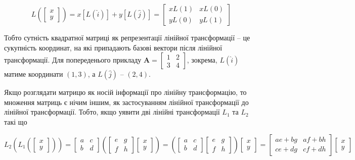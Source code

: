 \documentclass[
  11pt,
]{book}
\begin{document}
\[L \left( \begin{bmatrix} x \\ y \end{bmatrix} \right) = x[L (\hat{i})] + y[L(\hat{j})] = \begin{bmatrix} x L(1) & xL(0) \\ y L(0) & y L(1) \end{bmatrix}\]

Тобто сутність квадратної матриці як репрезентації лінійної трансформації -- це сукупність координат, на які припадають базові вектори після лінійної трансформації. Для попереденього прикладу \(\mathbf{A} = \begin{bmatrix} 1 & 2 \\ 3 & 4 \end{bmatrix}\), зокрема, \(L(\hat{i})\) матиме координати \((1, 3)\), а \(L(\hat{j})\) -- \((2, 4)\).

Якщо розглядати матрицю як носій інформації про лінійну трансформацію, то множення матриць є нічим іншим, як застосуванням лінійної трансформації до лінійної трансформації. Тобто, якщо уявити дві лінійні трансформації \(L_1\) та \(L_2\) такі що

\[L_2 \left( L_1 \left( \begin{bmatrix} 
x \\ 
y 
\end{bmatrix} \right) \right) = 
\begin{bmatrix} 
a & c \\ 
b & d
\end{bmatrix}
\left( 
\begin{bmatrix} 
e & g \\ 
f & h
\end{bmatrix}
\begin{bmatrix} 
x \\ 
y 
\end{bmatrix}
\right) = 
\left( 
\begin{bmatrix} 
a & c \\ 
b & d
\end{bmatrix}
\begin{bmatrix} 
e & g \\ 
f & h
\end{bmatrix}
\right)
\begin{bmatrix} 
x \\ 
y 
\end{bmatrix} = 
\begin{bmatrix} 
ae + bg & af + bh \\ 
ce + dg & cf + dh
\end{bmatrix}
\begin{bmatrix} 
x \\ 
y 
\end{bmatrix}\]
\end{document}
